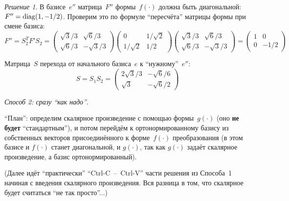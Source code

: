 \documentclass[a4paper,12pt]{article}
\theoremstyle{remark}
\newtheorem*{finalsolution}{Решение}
\begin{document}
\begin{finalsolution}
    В базисе~$e''$ матрица~$F''$ формы~$f(\cdot)$ должна быть диагональной: $F'' \hm= \diag(1, -1/2)$.
    Проверим это по формуле ``пересчёта'' матрицы формы при смене базиса:
    \[
      F'' = S_2^T F' S_2 = \begin{pmatrix}
        \sqrt{3} \big/ 3 & \sqrt{6} \big/ 3\\
        \sqrt{6} \big/ 3 & -\sqrt{3} \big/ 3
      \end{pmatrix}
      \begin{pmatrix}
        0                & 1 \big/ \sqrt{2}\\
        1 \big/ \sqrt{2} & 1/2
      \end{pmatrix}
      \begin{pmatrix}
        \sqrt{3} \big/ 3 & \sqrt{6} \big/ 3\\
        \sqrt{6} \big/ 3 & -\sqrt{3} \big/ 3
      \end{pmatrix}
      = \begin{pmatrix}
        1 & 0\\
        0 & -1/2
      \end{pmatrix}
    \]
    
    Матрица~$S$ перехода от начального базиса~$e$ к ``нужному''~$e''$:
    \[
      S = S_1 S_2 = \begin{pmatrix}
        2 \sqrt{3} \big/ 3 & -\sqrt{6} \big/ 6\\
        \sqrt{3}           & -\sqrt{6} \big/ 2
      \end{pmatrix}
    \]
  
    \medskip
    
    \emph{Способ 2: сразу ``как надо''}.
    
    ``План'': определим скалярное произведение с помощью формы~$g(\cdot)$ (оно \textbf{не будет} ``стандартным''), и потом перейдём к ортонормированному базису из собственных векторов присоединённого к форме~$f(\cdot)$ преобразования (в этом базисе и $f(\cdot)$ станет диагональной, и $g(\cdot)$, так как $g(\cdot)$ задаёт скалярное произведение, а базис ортонормированный).
    
    (Далее идёт ``практически'' ``Ctrl-C~--~Ctrl-V'' части решения из Способа~1 начиная с введения скалярного произведения.
    Вся разница в том, что скалярное будет считаться ``не так просто''...)


\end{finalsolution}
\end{document}
